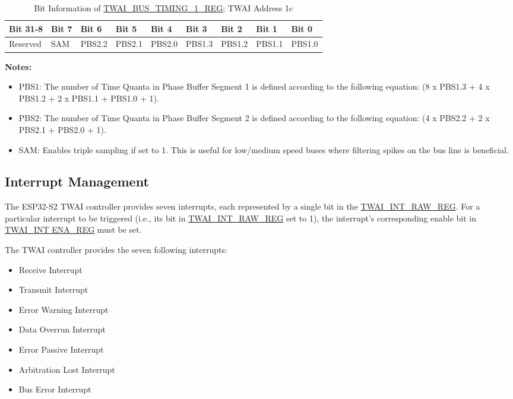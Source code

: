 \documentclass[main\_\_EN.tex]{subfiles}
\begin{document}
\begin{longtable}[c]{|p{1.4cm}|p{1.4cm}|p{1.4cm}|p{1.4cm}|p{1.4cm}|p{1.4cm}|p{1.4cm}|p{1.4cm}|p{1.4cm}|}
    \caption{Bit Information of \hyperref[regdesc:TWAIBUSTIMING1REG]{TWAI\_BUS\_TIMING\_1\_REG}; TWAI Address \hexprefix{}1c}
    \label{table:Bit_timing_1}\\
    \hline
       \rowcolor{lightgray}
   Bit 31-8 & Bit 7 & Bit 6 & Bit 5 & Bit 4 & Bit 3 & Bit 2 & Bit 1 & Bit 0\\\hline
   Reserved & SAM & PBS2.2 & PBS2.1 & PBS2.0 & PBS1.3 &PBS1.2 & PBS1.1 & PBS1.0\\
    \hline
\end{longtable}
\vspace{-1.5em}
{\bfseries Notes:}\\
\begin{itemize}
    \item PBS1: The number of Time Quanta in Phase Buffer Segment 1 is defined according to the following equation: (8 x PBS1.3 + 4 x PBS1.2 + 2 x PBS1.1 + PBS1.0 + 1).
    \item PBS2: The number of Time Quanta in Phase Buffer Segment 2 is defined according to the following equation: (4 x PBS2.2 + 2 x PBS2.1 + PBS2.0 + 1).
    \item SAM: Enables triple sampling if set to 1. This is useful for low/medium speed buses where filtering spikes on the bus line is beneficial.
\end{itemize}

\subsection{Interrupt Management}
\label{subsubsec:interrupt-management}
The ESP32-S2 TWAI controller provides seven interrupts, each represented by a single bit in the \hyperref[regdesc:TWAIINTRAWREG]{TWAI\_INT\_RAW\_REG}. For a particular interrupt to be triggered (i.e., its bit in \hyperref[regdesc:TWAIINTRAWREG]{TWAI\_INT\_RAW\_REG} set to 1), the interrupt’s corresponding enable bit in \hyperref[regdesc:TWAIINT ENAREG]{TWAI\_INT ENA\_REG} must be set.

The TWAI controller provides the seven following interrupts:

\begin{itemize}
    \item Receive Interrupt
    \item Transmit Interrupt
    \item Error Warning Interrupt
    \item Data Overrun Interrupt
    \item Error Passive Interrupt
    \item Arbitration Lost Interrupt
    \item Bus Error Interrupt
\end{itemize}
\end{document}
